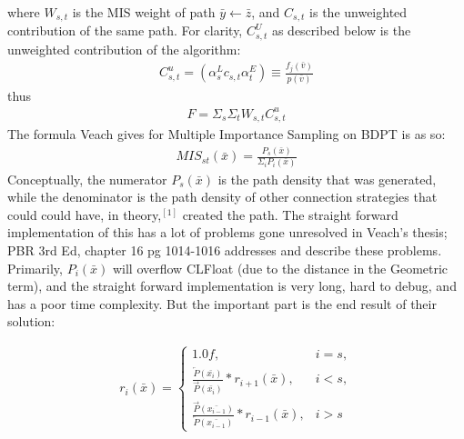 \documentclass{article}
\begin{document}
    where $W_{s, t}$ is the MIS weight of path $\bar{y} \leftarrow \bar{z}$, and
    $C_{s, t}$ is the unweighted contribution of the same path. For clarity,
    $C^U_{s, t}$ as described below is the unweighted contribution of the
    algorithm:
  \begin{align}
    C^u_{s, t} = (\alpha^L_s c_{s, t} \alpha^E_t) \equiv
    \frac{f_j(\bar{v})}{p(\bar{v})}
  \end{align}
  thus
  \begin{align}
    F = \Sigma_s\Sigma_tW_{s, t}C^u_{s, t}
  \end{align}
    The formula Veach gives for Multiple Importance Sampling on BDPT is as so:
  \begin{align}
    MIS_{st}(\bar{x}) = \frac{P_s(\bar{x})}{\Sigma_i{P_i(\bar{x})}} 
  \end{align}
    Conceptually, the numerator $P_s(\bar{x})$ is the path density that was
    generated, while the denominator is the path density of other connection
    strategies that could could have, in theory,$^{[1]}$ created the path. The
    straight forward implementation of this has a lot of problems gone
    unresolved in Veach's thesis; PBR 3rd Ed, chapter 16 pg 1014-1016 addresses
    and describe these problems. Primarily, $P_i(\bar{x})$ will overflow
    CLFloat (due to the distance in the Geometric term), and the straight
    forward implementation is very long, hard to debug, and has a poor time
    complexity. But the important part is the end result of their solution:

  \begin{align}
    r_i (\bar{x}) = 
    \begin{cases}
      1.0f, & i = s,\\
      \frac{\overleftarrow{P}(\bar{x_i})}{\overrightarrow{P}(\bar{x_i})} *
      r_{i+1}(\bar{x}), & i < s,\\
      \frac{\overrightarrow{P}(\bar{x_{i-1}})}{\overleftarrow{P}(\bar{x_{i-1}})}
      * r_{i-1}(\bar{x}), & i > s
    \end{cases}
  \end{align}
\end{document}
